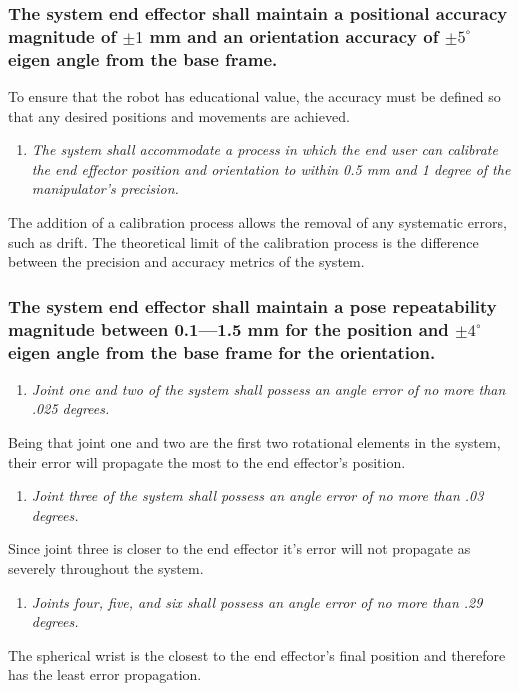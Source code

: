 \documentclass[12pt]{report}
\begin{document}
\subsubsection{The system end effector shall maintain a positional accuracy magnitude of \(\pm 1\) mm and an orientation accuracy of \(\pm 5^{\circ}\) eigen angle from the base frame.}
To ensure that the robot has educational value, the accuracy must be defined so that any desired positions and movements are achieved.
\begin{enumerate}
  \item \textit{The system shall accommodate a process in which the end user can calibrate the end effector position and orientation to within 0.5 mm and 1 degree of the manipulator’s precision.}
\end{enumerate}
The addition of a calibration process allows the removal of any systematic errors, such as drift. The theoretical limit of the calibration process is the difference between the precision and accuracy metrics of the system.
\subsubsection{The system end effector shall maintain a pose repeatability magnitude between 0.1—1.5 mm for the position and \(\pm 4^{\circ}\) eigen angle from the base frame for the orientation.}
\begin{enumerate}
  \item \textit{Joint one and two of the system shall possess an angle error of no more than .025 degrees.}
\end{enumerate}
Being that joint one and two are the first two rotational elements in the system, their error will propagate the most to the end effector's position.
\begin{enumerate}[resume]
  \item \textit{Joint three of the system shall possess an angle error of no more than .03 degrees.}
\end{enumerate}
Since joint three is closer to the end effector it's error will not propagate as severely throughout the system.
\begin{enumerate}[resume]
  \item \textit{Joints four, five, and six shall possess an angle error of no more than .29 degrees.}
\end{enumerate}
The spherical wrist is the closest to the end effector's final position and therefore has the least error propagation.
\end{document}
